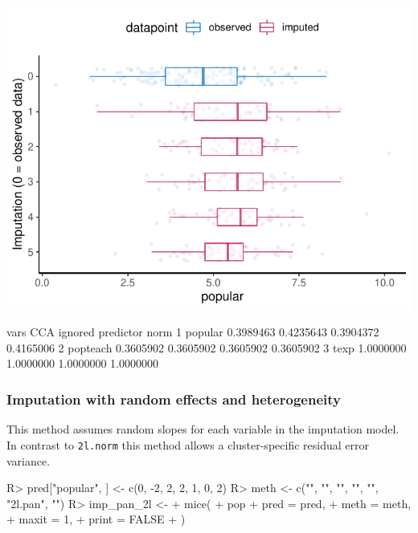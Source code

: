 \documentclass[
]{jss}
\begin{document}
\begin{CodeChunk}


\begin{center}\includegraphics{Manuscript_files/figure-latex/pop_norm_eval-1} \end{center}

\begin{CodeOutput}
      vars       CCA   ignored predictor      norm
1  popular 0.3989463 0.4235643 0.3904372 0.4165006
2 popteach 0.3605902 0.3605902 0.3605902 0.3605902
3     texp 1.0000000 1.0000000 1.0000000 1.0000000
\end{CodeOutput}
\end{CodeChunk}

\hypertarget{imputation-with-random-effects-and-heterogeneity}{%
\subsubsection{Imputation with random effects and
heterogeneity}\label{imputation-with-random-effects-and-heterogeneity}}

This method assumes random slopes for each variable in the imputation
model. In contrast to \texttt{2l.norm} this method allows a
cluster-specific residual error variance.

\begin{CodeChunk}
\begin{CodeInput}
R> pred["popular", ] <- c(0, -2, 2, 2, 1, 0, 2)
R> meth <- c("", "", "", "", "", "2l.pan", "")
R> imp_pan_2l <-
+   mice(
+     pop %
+     pred = pred,
+     meth = meth,
+     maxit = 1,
+     print = FALSE
+   )
\end{CodeInput}
\end{CodeChunk}
\end{document}
